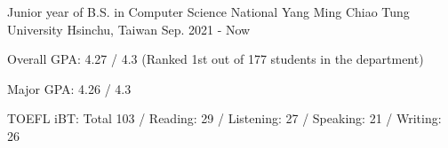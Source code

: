 

\begin{cventries}

  \cventry
    {Junior year of B.S. in Computer Science} %
    {National Yang Ming Chiao Tung University} %
    {Hsinchu, Taiwan} %
    {Sep. 2021 - Now} %
    {
      \begin{cvitems} %
        \item {Overall GPA: 4.27 / 4.3 (Ranked 1st out of 177 students in the department)}
        \item {Major GPA: 4.26 / 4.3}
        \item {TOEFL iBT: Total 103 / Reading: 29 / Listening: 27 / Speaking: 21 / Writing: 26}
      \end{cvitems}
    }

\end{cventries}


    
    
    

